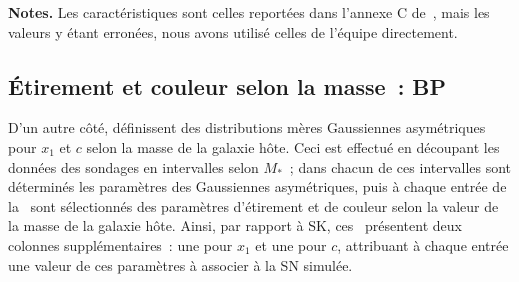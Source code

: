 \documentclass[../main/main.tex]{subfiles}
\begin{document}
\begin{table}[ht]
    \centering
        \caption[Paramètres de la distribution d'étirement pour l'échantillon
        LOWZ des simulations SK]{Paramètres de la distribution sous-jacente
            d'étirement pour l'échantillon LOWZ dans notre reproduction de
        l'étude de~.}\label{tab:sklowz}
    \begin{threeparttable}
        \begin{tablenotes}[flushleft]
        \item\small \textbf{\hspace{-3,2pt}Notes.} Les caractéristiques sont
            celles reportées dans l'annexe C de~\cite{scolnic2018}, mais les
            valeurs y étant erronées, nous avons utilisé celles de l'équipe
            directement.
        \end{tablenotes}
    \end{threeparttable}
\end{table}

\subsection{Étirement et couleur selon la masse~: BP}\label{ssec:bp}

D'un autre côté,  définissent des distributions mères
Gaussiennes asymétriques pour $x_1$ et $c$ selon la masse de la galaxie hôte.
Ceci est effectué en découpant les données des sondages en intervalles selon
$M_*$~; dans chacun de ces intervalles sont déterminés les paramètres des
Gaussiennes asymétriques, puis à chaque entrée de la \hostlib\ sont sélectionnés
des paramètres d'étirement et de couleur selon la valeur de la masse de la
galaxie hôte. Ainsi, par rapport à SK, ces \hostlib\ présentent deux colonnes
supplémentaires~: une pour $x_1$ et une pour $c$, attribuant à chaque entrée une
valeur de ces paramètres à associer à la SN simulée. 
\end{document}
